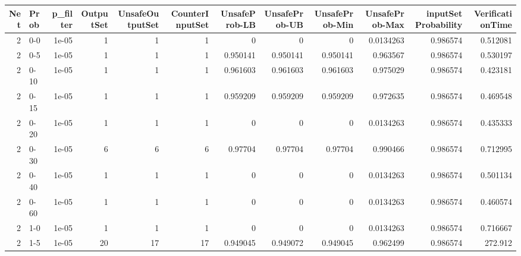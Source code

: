\begin{tabular}{rlrrrrrrrrrr}
\hline
   Net & Prob   &   p\_filter &   OutputSet &   UnsafeOutputSet &   CounterInputSet &   UnsafeProb-LB &   UnsafeProb-UB &   UnsafeProb-Min &   UnsafeProb-Max &   inputSet Probability &   VerificationTime \\
\hline
     2 & 0-0    &      1e-05 &           1 &                 1 &                 1 &        0        &        0        &         0        &        0.0134263 &               0.986574 &           0.512081 \\
     2 & 0-5    &      1e-05 &           1 &                 1 &                 1 &        0.950141 &        0.950141 &         0.950141 &        0.963567  &               0.986574 &           0.530197 \\
     2 & 0-10   &      1e-05 &           1 &                 1 &                 1 &        0.961603 &        0.961603 &         0.961603 &        0.975029  &               0.986574 &           0.423181 \\
     2 & 0-15   &      1e-05 &           1 &                 1 &                 1 &        0.959209 &        0.959209 &         0.959209 &        0.972635  &               0.986574 &           0.469548 \\
     2 & 0-20   &      1e-05 &           1 &                 1 &                 1 &        0        &        0        &         0        &        0.0134263 &               0.986574 &           0.435333 \\
     2 & 0-30   &      1e-05 &           6 &                 6 &                 6 &        0.97704  &        0.97704  &         0.97704  &        0.990466  &               0.986574 &           0.712995 \\
     2 & 0-40   &      1e-05 &           1 &                 1 &                 1 &        0        &        0        &         0        &        0.0134263 &               0.986574 &           0.501134 \\
     2 & 0-60   &      1e-05 &           1 &                 1 &                 1 &        0        &        0        &         0        &        0.0134263 &               0.986574 &           0.460574 \\
     2 & 1-0    &      1e-05 &           1 &                 1 &                 1 &        0        &        0        &         0        &        0.0134263 &               0.986574 &           0.716667 \\
     2 & 1-5    &      1e-05 &          20 &                17 &                17 &        0.949045 &        0.949072 &         0.949045 &        0.962499  &               0.986574 &         272.912    \\

\end{tabular}
